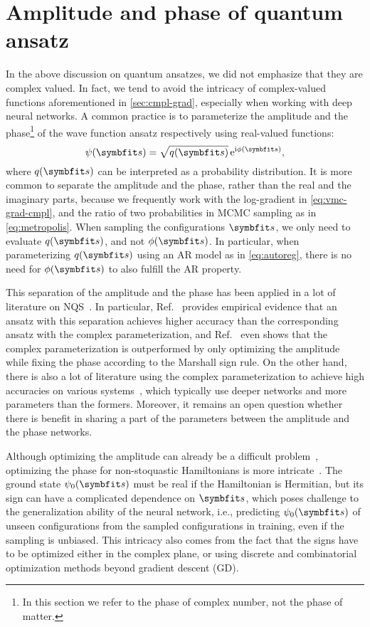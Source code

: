 \section{Amplitude and phase of quantum ansatz}
\label{sec:amp-phase}

In the above discussion on quantum ansatzes, we did not emphasize that they are complex valued. In fact, we tend to avoid the intricacy of complex-valued functions aforementioned in \cref{sec:cmpl-grad}, especially when working with deep neural networks. A common practice is to parameterize the amplitude and the phase\footnote{In this section we refer to the phase of complex number, not the phase of matter.} of the wave function ansatz respectively using real-valued functions:
\begin{equation}
\psi(\vs) = \sqrt{q(\vs)}\,\rme^{\rmi \phi(\vs)},
\label{eq:psi-q-phi}
\end{equation}
where $q(\vs)$ can be interpreted as a probability distribution. It is more common to separate the amplitude and the phase, rather than the real and the imaginary parts, because we frequently work with the log-gradient in \cref{eq:vmc-grad-cmpl}, and the ratio of two probabilities in MCMC sampling as in \cref{eq:metropolis}. When sampling the configurations $\vs$, we only need to evaluate $q(\vs)$, and not $\phi(\vs)$. In particular, when parameterizing $q(\vs)$ using an AR model as in \cref{eq:autoreg}, there is no need for $\phi(\vs)$ to also fulfill the AR property.

This separation of the amplitude and the phase has been applied in a lot of literature on NQS~\cite{torlai2018neural, hibat2020recurrent, astrakhantsev2021broken}. In particular, Ref.~\cite{bukov2021learning} provides empirical evidence that an ansatz with this separation achieves higher accuracy than the corresponding ansatz with the complex parameterization, and Ref.~\cite{wang2024variational} even shows that the complex parameterization is outperformed by only optimizing the amplitude while fixing the phase according to the Marshall sign rule. On the other hand, there is also a lot of literature using the complex parameterization to achieve high accuracies on various systems~\cite{roth2020iterative, li2022bridging, viteritti2023transformer}, which typically use deeper networks and more parameters than the formers. Moreover, it remains an open question whether there is benefit in sharing a part of the parameters between the amplitude and the phase networks.

Although optimizing the amplitude can already be a difficult problem~\cite{bukov2021learning, park2022expressive}, optimizing the phase for non-stoquastic Hamiltonians is more intricate~\cite{westerhout2020generalization, szabo2020neural}. The ground state $\psi_0(\vs)$ must be real if the Hamiltonian is Hermitian, but its sign can have a complicated dependence on $\vs$, which poses challenge to the generalization ability of the neural network, i.e., predicting $\psi_0(\vs)$ of unseen configurations from the sampled configurations in training, even if the sampling is unbiased. This intricacy also comes from the fact that the signs have to be optimized either in the complex plane, or using discrete and combinatorial optimization methods beyond gradient descent (GD).


